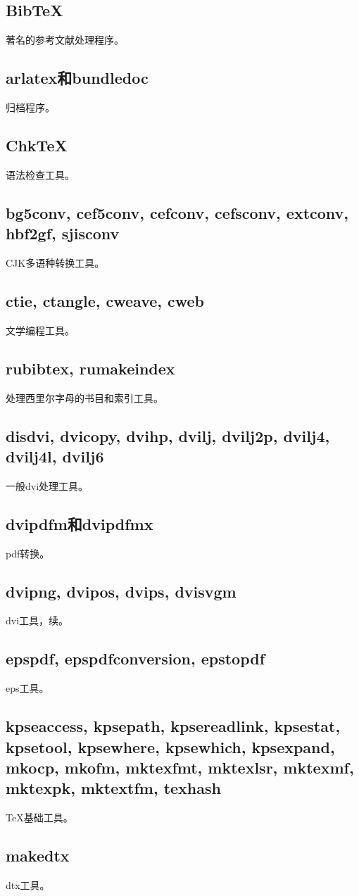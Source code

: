 \documentclass{article}
\begin{document}
\subsection{BibTeX }
著名的参考文献处理程序。
\subsection{arlatex和bundledoc}
归档程序。
\subsection{ChkTeX}
语法检查工具。
\subsection{bg5conv, cef5conv, cefconv, cefsconv, extconv, hbf2gf, sjisconv}
CJK多语种转换工具。
\subsection{ctie, ctangle, cweave, cweb}
文学编程工具。
\subsection{rubibtex, rumakeindex}
处理西里尔字母的书目和索引工具。
\subsection{disdvi, dvicopy, dvihp, dvilj, dvilj2p, dvilj4, dvilj4l, dvilj6}
一般dvi处理工具。
\subsection{dvipdfm和dvipdfmx}
pdf转换。
\subsection{dvipng, dvipos, dvips, dvisvgm}
dvi工具，续。
\subsection{epspdf, epspdfconversion, epstopdf}
eps工具。
\subsection{kpseaccess, kpsepath, kpsereadlink, kpsestat, kpsetool, kpsewhere, kpsewhich, kpsexpand, mkocp, mkofm, mktexfmt, mktexlsr, mktexmf, mktexpk, mktextfm, texhash}
\TeX 基础工具。
\subsection{makedtx}
dtx工具。
\end{document}
